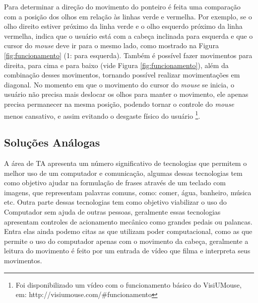 Para determinar a direção do movimento do ponteiro é feita uma comparação com a posição dos olhos em relação às linhas verde e vermelha. Por exemplo, se o olho direito estiver próximo da linha verde e o olho esquerdo próximo da linha vermelha, indica que o usuário está com a cabeça inclinada para esquerda e que o cursor do \textit{mouse} deve ir para o mesmo lado, como mostrado na Figura \ref{fig:funcionamento} (1: para esquerda). Também é possível fazer movimentos para direita, para cima e para baixo (vide Figura \ref{fig:funcionamento}), além da combinação desses movimentos, tornando possível realizar movimentações em diagonal. No momento em que o movimento do cursor do \textit{mouse} se inicia, o usuário não precisa mais deslocar os olhos para manter o movimento, ele apenas precisa permanecer na mesma posição, podendo tornar o controle do \textit{mouse} menos cansativo, e assim evitando o desgaste físico do usuário \footnote{Foi disponibilizado um vídeo com o funcionamento básico do VisiUMouse, em: http://visiumouse.com/\#funcionamento}. 

\subsection{Soluções Análogas}\label{Sub:tabela-comparativa}
% 
% 
A área de TA apresenta um número significativo de tecnologias que permitem o melhor uso de um computador e comunicação, algumas dessas tecnologias tem como objetivo ajudar na formulação de frases através de um teclado com imagens, que representam palavras comuns, como: comer, água, banheiro, música etc. Outra parte dessas tecnologias tem como objetivo viabilizar o uso do Computador sem ajuda de outras pessoas, geralmente essas tecnologias apresentam controles de acionamento mecânico como grandes pedais ou palancas. Entra elas ainda podemo citas as que utilizam poder computacional, como as que permite o uso do computador apenas com o movimento da cabeça, geralmente a leitura do movimento é feito por um  entrada de vídeo que filma e interpreta seus movimentos.

